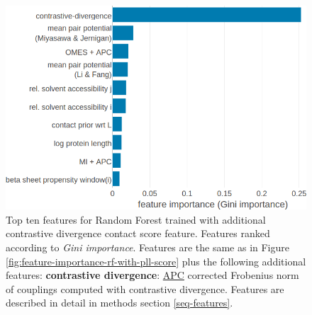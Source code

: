 \documentclass[11pt,a4paper,twoside]{book}
\theoremstyle{definition}
\theoremstyle{definition}
\theoremstyle{remark}
\begin{document}
\begin{figure}

{\centering \includegraphics[width=1\linewidth]{img/random_forest_contact_prior/additional_contat_score_features/feature_random_forest_nestimators1000_maxfeatures030_cd} 

}

\caption{Top ten features for
Random Forest trained with additional contrastive divergence contact
score feature. Features ranked according to \emph{Gini importance}.
Features are the same as in Figure
\ref{fig:feature-importance-rf-with-pll-score} plus the following
additional features: \textbf{contrastive divergence}:
\protect\hyperlink{abbrev}{APC} corrected Frobenius norm of couplings
computed with contrastive divergence. Features are described in detail
in methods section \ref{seq-features}.}\label{fig:feature-importance-rf-with-cd-score}
\end{figure}
\end{document}
